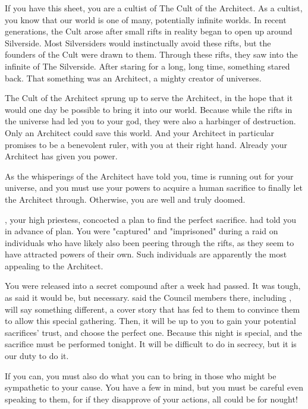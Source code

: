 \documentclass[blue]{Silversiders}
\begin{document}
\name{\bCult{}}

If you have this sheet, you are a cultist of The Cult of the Architect. As a cultist, you know that our world is one of many, potentially infinite worlds. In recent generations, the Cult arose after small rifts in reality began to open up around Silverside. Most Silversiders would instinctually avoid these rifts, but the founders of the Cult were drawn to them. Through these rifts, they saw into the infinite of The Silverside. After staring for a long, long time, something stared back. That something was an Architect, a mighty creator of universes.

The Cult of the Architect sprung up to serve the Architect, in the hope that it would one day be possible to bring it into our world. Because while the rifts in the universe had led you to your god, they were also a harbinger of destruction. Only an Architect could save this world. And your Architect in particular promises to be a benevolent ruler, with you at their right hand. Already your Architect has given you power. 


As the whisperings of the Architect have told you, time is running out for your universe, and you must use your powers to acquire a human sacrifice to finally let the Architect through. Otherwise, you are well and truly doomed.

\cWar{}, your high priestess, concocted a plan to find the perfect sacrifice. \cWar{\They} had told you in advance of \cWar{\their} plan. You were "captured" and "imprisoned" during a raid on individuals who have likely also been peering through the rifts, as they seem to have attracted powers of their own. Such individuals are apparently the most appealing to the Architect.

You were released into a secret compound after a week had passed. It was tough, as \cWar{} said it would be, but necessary. \cWar{\They} said the Council members there, including \cWar{\them}, will say something different, a cover story that \cWar{\they} has fed to them to convince them to allow this special gathering. Then, it will be up to you to gain your potential sacrifices' trust, and choose the perfect one. Because this night is special, and the sacrifice must be performed tonight. It will be difficult to do in secrecy, but it is our duty to do it.

If you can, you must also do what you can to bring in those who might be sympathetic to your cause. You have a few in mind, but you must be careful even speaking to them, for if they disapprove of your actions, all could be for nought!
\end{document}
